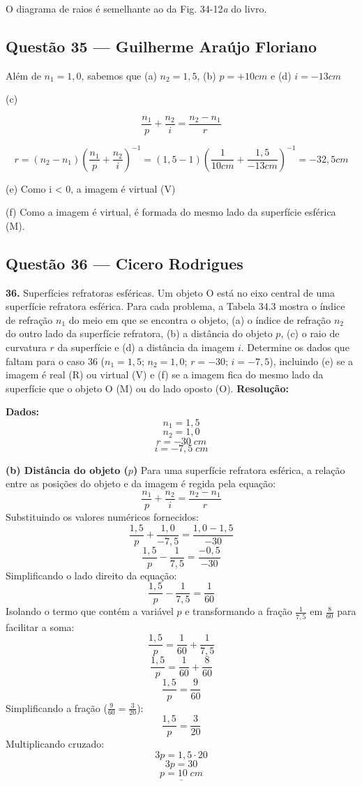 \documentclass[12pt,a4paper]{article}
\begin{document}
\vspace{0.5cm}

\noindent O diagrama de raios é semelhante ao da Fig. 34-12\textit{a} do livro.

\subsection{Questão 35 — Guilherme Araújo Floriano}

Além de $n_1 = 1,0$, sabemos que (a) $n_2 = 1,5$, (b) $p = +10 cm$ e (d) $i = -13 cm$

(c) 

\[
\frac{n_1}{p} + \frac{n_2}{i} = \frac{n_2 - n_1}{r}    
\]

\[
r = (n_2 - n_1)(\frac{n_1}{p} + \frac{n_2}{i})^{-1} = (1,5-1)(\frac{1}{10 cm} + \frac{1,5}{-13 cm})^{-1} = -32,5 cm
\]

(e) Como i < 0, a imagem é virtual (V)

(f) Como a imagem é virtual, é formada do mesmo lado da superfície esférica (M).

\subsection{Questão 36 — Cicero Rodrigues}

\textbf{36. }\normalfont Superfícies refratoras esféricas. Um objeto O está no eixo central de uma superfície refratora esférica. Para cada problema, a Tabela 34.3 mostra o índice de refração $n_1$ do meio em que se encontra o objeto, (a) o índice de refração $n_2$ do outro lado da superfície refratora, (b) a distância do objeto $p$, (c) o raio de curvatura $r$ da superfície e (d) a distância da imagem $i$. Determine os dados que faltam para o caso 36 ($n_1 = 1,5$; $n_2 = 1,0$; $r = -30$; $i = -7,5$), incluindo (e) se a imagem é real (R) ou virtual (V) e (f) se a imagem fica do mesmo lado da superfície que o objeto O (M) ou do lado oposto (O).
\textbf{Resolução:}
\vspace{0.3cm}

\textbf{Dados:}
\[n_1 = 1,5\]
\[n_2 = 1,0\]
\[r = -30\;cm\]
\[i = -7,5\;cm\]

\vspace{0.2cm}
\textbf{(b) Distância do objeto (\(p\))}
Para uma superfície refratora esférica, a relação entre as posições do objeto e da imagem é regida pela equação:
\[\frac{n_1}{p} + \frac{n_2}{i} = \frac{n_2 - n_1}{r}\]
Substituindo os valores numéricos fornecidos:
\[\frac{1,5}{p} + \frac{1,0}{-7,5} = \frac{1,0 - 1,5}{-30}\]
\[\frac{1,5}{p} - \frac{1}{7,5} = \frac{-0,5}{-30}\]
Simplificando o lado direito da equação:
\[\frac{1,5}{p} - \frac{1}{7,5} = \frac{1}{60}\]
Isolando o termo que contém a variável \(p\) e transformando a fração \(\frac{1}{7,5}\) em \(\frac{8}{60}\) para facilitar a soma:
\[\frac{1,5}{p} = \frac{1}{60} + \frac{1}{7,5}\]
\[\frac{1,5}{p} = \frac{1}{60} + \frac{8}{60}\]
\[\frac{1,5}{p} = \frac{9}{60}\]
Simplificando a fração (\(\frac{9}{60} = \frac{3}{20}\)):
\[\frac{1,5}{p} = \frac{3}{20}\]
Multiplicando cruzado:
\[3p = 1,5 \cdot 20\]
\[3p = 30\]
\[\underline{p = 10\;cm}\]
\end{document}
